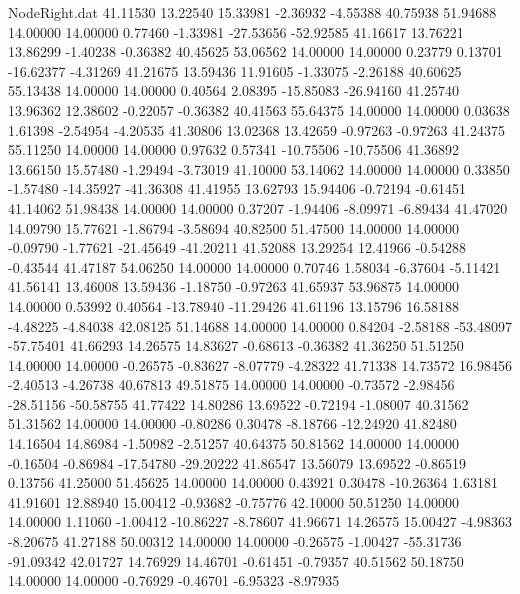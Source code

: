 \begin{filecontents}{NodeRight.dat}
  41.11530   13.22540   15.33981    -2.36932   -4.55388   40.75938   51.94688   14.00000   14.00000    0.77460   -1.33981  -27.53656  -52.92585
  41.16617   13.76221   13.86299    -1.40238   -0.36382   40.45625   53.06562   14.00000   14.00000    0.23779    0.13701  -16.62377   -4.31269
  41.21675   13.59436   11.91605    -1.33075   -2.26188   40.60625   55.13438   14.00000   14.00000    0.40564    2.08395  -15.85083  -26.94160
  41.25740   13.96362   12.38602    -0.22057   -0.36382   40.41563   55.64375   14.00000   14.00000    0.03638    1.61398   -2.54954   -4.20535
  41.30806   13.02368   13.42659    -0.97263   -0.97263   41.24375   55.11250   14.00000   14.00000    0.97632    0.57341  -10.75506  -10.75506
  41.36892   13.66150   15.57480    -1.29494   -3.73019   41.10000   53.14062   14.00000   14.00000    0.33850   -1.57480  -14.35927  -41.36308
  41.41955   13.62793   15.94406    -0.72194   -0.61451   41.14062   51.98438   14.00000   14.00000    0.37207   -1.94406   -8.09971   -6.89434
  41.47020   14.09790   15.77621    -1.86794   -3.58694   40.82500   51.47500   14.00000   14.00000   -0.09790   -1.77621  -21.45649  -41.20211
  41.52088   13.29254   12.41966    -0.54288   -0.43544   41.47187   54.06250   14.00000   14.00000    0.70746    1.58034   -6.37604   -5.11421
  41.56141   13.46008   13.59436    -1.18750   -0.97263   41.65937   53.96875   14.00000   14.00000    0.53992    0.40564  -13.78940  -11.29426
  41.61196   13.15796   16.58188    -4.48225   -4.84038   42.08125   51.14688   14.00000   14.00000    0.84204   -2.58188  -53.48097  -57.75401
  41.66293   14.26575   14.83627    -0.68613   -0.36382   41.36250   51.51250   14.00000   14.00000   -0.26575   -0.83627   -8.07779   -4.28322
  41.71338   14.73572   16.98456    -2.40513   -4.26738   40.67813   49.51875   14.00000   14.00000   -0.73572   -2.98456  -28.51156  -50.58755
  41.77422   14.80286   13.69522    -0.72194   -1.08007   40.31562   51.31562   14.00000   14.00000   -0.80286    0.30478   -8.18766  -12.24920
  41.82480   14.16504   14.86984    -1.50982   -2.51257   40.64375   50.81562   14.00000   14.00000   -0.16504   -0.86984  -17.54780  -29.20222
  41.86547   13.56079   13.69522    -0.86519    0.13756   41.25000   51.45625   14.00000   14.00000    0.43921    0.30478  -10.26364    1.63181
  41.91601   12.88940   15.00412    -0.93682   -0.75776   42.10000   50.51250   14.00000   14.00000    1.11060   -1.00412  -10.86227   -8.78607
  41.96671   14.26575   15.00427    -4.98363   -8.20675   41.27188   50.00312   14.00000   14.00000   -0.26575   -1.00427  -55.31736  -91.09342
  42.01727   14.76929   14.46701    -0.61451   -0.79357   40.51562   50.18750   14.00000   14.00000   -0.76929   -0.46701   -6.95323   -8.97935

\end{filecontents}
